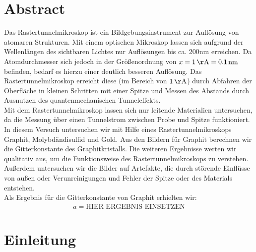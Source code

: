 \documentclass[12pt]{article}
\title{\vspace{0cm}{\Huge Fortgeschrittenen-Praktikum I:\\ \vspace{1cm} Rastertunnelmikroskop}}
\author{Saskia Bondza\\Simon Stephan}
\date{durchgeführt am 07. und 10.10.2016}
\begin{document}
\maketitle
\newpage

\section*{Abstract}
Das Rastertunnelmikroskop ist ein Bildgebungsinstrument zur Auflösung von atomaren Strukturen. Mit einem optischen Mikroskop lassen sich aufgrund der Wellenlängen des sichtbaren Lichtes nur Auflösungen bis ca. 200nm erreichen. Da Atomdurchmesser sich jedoch in der Größenordnung von $x=1\,\mathrm{\AA}=0.1\,\mathrm{nm}$ befinden, bedarf es hierzu einer deutlich besseren Auflösung. Das Rastertunnelmikroskop erreicht diese (im Bereich von $1\,\mathrm{\AA}$) durch Abfahren der Oberfläche in kleinen Schritten mit einer Spitze und Messen des Abstands durch Ausnutzen des quantenmechanischen Tunneleffekts.\\

Mit dem Rastertunnelmikroskop lassen sich nur leitende Materialien untersuchen, da die Messung über einen Tunnelstrom zwischen Probe und Spitze funktioniert. In diesem Versuch untersuchen wir mit Hilfe eines Rastertunnelmikroskops Graphit, Molybdändisulfid und Gold. Aus den Bildern für Graphit berechnen wir die Gitterkonstante des Graphitkristalls. Die weiteren Ergebnisse werten wir qualitativ aus, um die Funktionsweise des Rastertunnelmikroskops zu verstehen. Außerdem untersuchen wir die Bilder auf Artefakte, die durch störende Einflüsse von außen oder Verunreinigungen und Fehler der Spitze oder des Materials entstehen.\\

Als Ergebnis für die Gitterkonstante von Graphit erhielten wir:
\begin{align*}
	a=\text{HIER ERGEBNIS EINSETZEN}
\end{align*}

\newpage

\thispagestyle{empty}
\tableofcontents
\newpage

\section{Einleitung}
\end{document}
